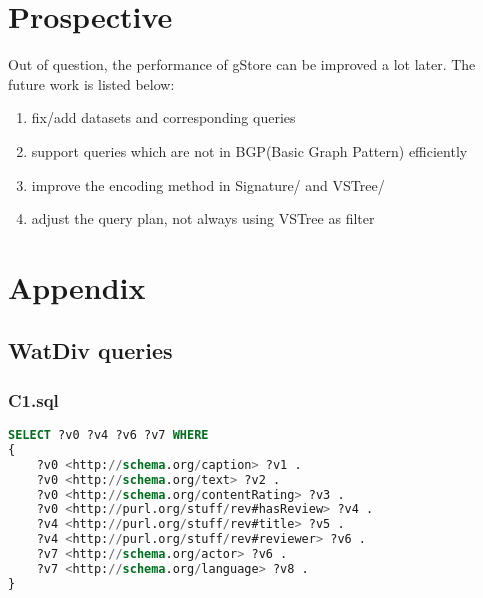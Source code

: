 \documentclass[titlepage, a4paper, 12pt] {article}
\begin{document}
\clearpage

\section{Prospective}

Out of question, the performance of gStore can be improved a lot later. 
The future work is listed below:
\begin{enumerate}
	\item fix/add datasets and corresponding queries 
	\item support queries which are not in BGP(Basic Graph Pattern) efficiently
	\item improve the encoding method in Signature/ and VSTree/
	\item adjust the query plan, not always using VSTree as filter
\end{enumerate}

\clearpage

\section{Appendix}

%		


\subsection{WatDiv queries}\label{watdiv}

\subsubsection{C1.sql}

\begin{lstlisting}[language=SQL] 
SELECT ?v0 ?v4 ?v6 ?v7 WHERE 
{
	?v0 <http://schema.org/caption> ?v1 .
	?v0 <http://schema.org/text> ?v2 .
	?v0 <http://schema.org/contentRating> ?v3 .
	?v0 <http://purl.org/stuff/rev#hasReview> ?v4 .
	?v4 <http://purl.org/stuff/rev#title> ?v5 .
	?v4 <http://purl.org/stuff/rev#reviewer> ?v6 .
	?v7 <http://schema.org/actor> ?v6 .
	?v7 <http://schema.org/language> ?v8 .
}
\end{lstlisting} 
\end{document}
